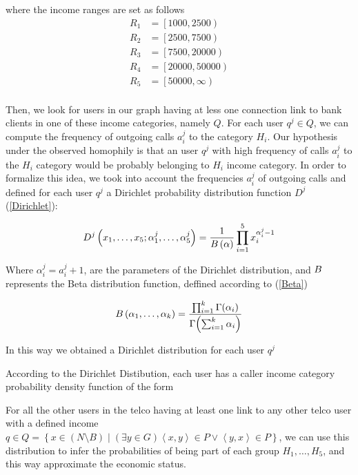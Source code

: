 where the income ranges are set as follows
\begin{align*}
	R_1 &= \left[1000, 2500\right) \\
	R_2 &= \left[2500, 7500\right) \\
	R_3 &= \left[7500, 20000\right) \\
	R_4 &= \left[20000, 50000\right) \\
	R_5 &= \left[50000, \infty\right) \\
\end{align*}

Then, we look for users in our graph having at less one connection link to bank clients in one of these income categories, namely $Q$. For each user $q^j \in Q$, we can compute the frequency of outgoing calls $a^j_i$ to the category $H_i$. Our hypothesis under the observed homophily is that an user $q^j$ with high frequency of calls $a^j_i$ to the $H_i$ category would be probably belonging to $H_i$ income category. In order to formalize this idea, we took into account the frequencies $a^j_i$ of outgoing calls and defined for each user $q^j$ a Dirichlet probability distribution function $D^j$ (\eqref{Dirichlet}):  


\begin{equation}
D^j \left( x_1, \ldots, x_5; \alpha^j_1, \ldots, \alpha^j_5 \right) = \frac{1}{B \left( \alpha \right)} \prod^5_{i = 1} x_i^{\alpha^j_i - 1}
\label{Dirichlet}
\end{equation}

Where $\alpha^j_i = a^j_i +1$, are the parameters of the Dirichlet distribution, and $B$ represents the Beta distribution function, deffined according to (\eqref{Beta})

\begin{equation}
B \left( \alpha_1, \ldots, \alpha_k \right) = \frac{\prod^k_{i = 1} \Gamma \! \left( \alpha_i \right)}{\Gamma \! \left( \sum^k_{i = 1} \alpha_i \right) }
\label{Beta} 
\end{equation}

In this way we obtained a Dirichlet distribution for each user $q^j$


According to the Dirichlet Distibution, each user has a caller income category probability density function of the form


For all the other users in the telco having at least one link to any other telco user with a defined income $ q \in Q = \left\{x \in \left( N \setminus B \right) \mid (\exists y \in G) \left< x, y \right> \in P \vee \left< y, x \right> \in P \right\} $, we can use this distribution to infer the probabilities of being part of each group $ H_1, \ldots, H_5 $, and this way approximate the economic status.
